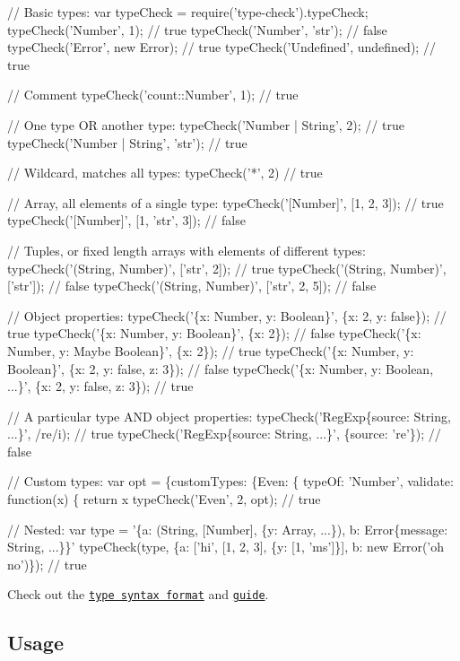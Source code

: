 \begin{DoxyCode}
// Basic types:
var typeCheck = require('type-check').typeCheck;
typeCheck('Number', 1);               // true
typeCheck('Number', 'str');           // false
typeCheck('Error', new Error);        // true
typeCheck('Undefined', undefined);    // true

// Comment
typeCheck('count::Number', 1);        // true

// One type OR another type:
typeCheck('Number | String', 2);      // true
typeCheck('Number | String', 'str');  // true

// Wildcard, matches all types:
typeCheck('*', 2) // true

// Array, all elements of a single type:
typeCheck('[Number]', [1, 2, 3]);                // true
typeCheck('[Number]', [1, 'str', 3]);            // false

// Tuples, or fixed length arrays with elements of different types:
typeCheck('(String, Number)', ['str', 2]);       // true
typeCheck('(String, Number)', ['str']);          // false
typeCheck('(String, Number)', ['str', 2, 5]);    // false

// Object properties:
typeCheck('\{x: Number, y: Boolean\}', \{x: 2, y: false\});             // true
typeCheck('\{x: Number, y: Boolean\}',       \{x: 2\});                 // false
typeCheck('\{x: Number, y: Maybe Boolean\}', \{x: 2\});                 // true
typeCheck('\{x: Number, y: Boolean\}',      \{x: 2, y: false, z: 3\});  // false
typeCheck('\{x: Number, y: Boolean, ...\}', \{x: 2, y: false, z: 3\});  // true

// A particular type AND object properties:
typeCheck('RegExp\{source: String, ...\}', /re/i);          // true
typeCheck('RegExp\{source: String, ...\}', \{source: 're'\}); // false

// Custom types:
var opt = \{customTypes:
  \{Even: \{ typeOf: 'Number', validate: function(x) \{ return x %
typeCheck('Even', 2, opt); // true

// Nested:
var type = '\{a: (String, [Number], \{y: Array, ...\}), b: Error\{message: String, ...\}\}'
typeCheck(type, \{a: ['hi', [1, 2, 3], \{y: [1, 'ms']\}], b: new Error('oh no')\}); // true
\end{DoxyCode}


Check out the \href{#syntax}{\tt type syntax format} and \href{#guide}{\tt guide}.

\subsection*{Usage}

